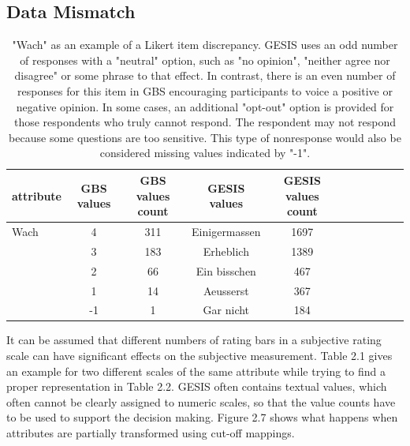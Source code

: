 \subsection{Data Mismatch}

\begin{table}[ht]
    \begin{center}
            {\footnotesize
            \begin{tabular}{l|c|ccccccccc}
                \hline \hline
		attribute & GBS values & GBS values count &  GESIS values & GESIS values count \\
                \hline \hline
                     Wach & 4 & 311 & Einigermassen & 1697 \\
                     & 3 & 183 & Erheblich & 1389 \\
                     & 2 & 66 & Ein bisschen & 467 \\ 
              	& 1 & 14 & Aeusserst & 367 \\	
		& -1 & 1 & Gar nicht & 184 \\		
	     \hline \hline
            \end{tabular}}
        \caption{"Wach" as an example of a Likert item discrepancy. GESIS uses an odd number of responses with a "neutral" option, such as "no opinion", "neither agree nor disagree" or some phrase to that effect. In contrast, there is an even number of responses for this item in GBS encouraging participants to voice a positive or negative opinion. In some cases, an additional "opt-out" option is provided for those respondents who truly cannot respond. The respondent may not respond because some questions are too sensitive. This type of nonresponse would also be considered missing values indicated by "-1".}
\end{center}
\end{table}
It can be assumed that different numbers of rating bars in a subjective rating scale can have significant effects on the subjective measurement. Table 2.1 gives an example for two different scales of the same attribute while trying to find a proper representation in Table 2.2. GESIS often contains textual values, which often cannot be clearly assigned to numeric scales, so that the value counts have to be used to support the decision making. Figure 2.7 shows what happens when attributes are partially transformed using cut-off mappings.
\vspace{0.33cm}
